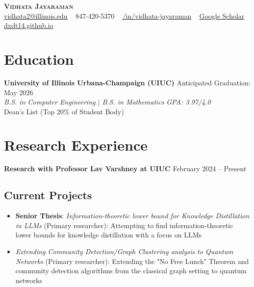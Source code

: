 \documentclass[letterpaper,10pt]{article}
\begin{document}
\begin{center}
    {\Huge \textbf{\scshape\textcolor{maincolor}{Vidhata Jayaraman}}}\\[5pt]
    \small
    {\color{maincolor}} \href{mailto:vidhata2@illinois.edu}{vidhata2@illinois.edu} {\raisebox{1.5pt}{\tiny\textbullet}}\ 
    {\color{maincolor}} 847-420-5370 {\raisebox{1.5pt}{\tiny\textbullet}}\ 
    {\color{maincolor}} \href{https://www.linkedin.com/in/vidhata-jayaraman/}{/in/vidhata-jayaraman} {\raisebox{1.5pt}{\tiny\textbullet}}\ 
    {\color{maincolor}\faGraduationCap} \href{https://scholar.google.com/citations?user=f16twSMAAAAJ&hl=en}{Google Scholar} {\raisebox{1.5pt}{\tiny\textbullet}}\ 
    {\color{maincolor}} \href{https://dxdt14.github.io/}{dxdt14.github.io}
\end{center}

\vspace{-3pt}


\section{Education}
\textbf{University of Illinois Urbana-Champaign (UIUC)} \hfill Anticipated Graduation: May 2026\\
\textit{B.S. in Computer Engineering $|$ B.S. in Mathematics} \hfill \textit{GPA: 3.97/4.0} \\
\small Dean's List (Top 20\% of Student Body)

\section{Research Experience}

\textbf{Research with Professor Lav Varshney at UIUC} \hfill February 2024 -- Present\vspace{-8pt}
\subsection{Current Projects}
\begin{itemize}[itemsep=-5pt, parsep=5pt, leftmargin=0.25in]
    \item \textbf{Senior Thesis}: \textit{Information-theoretic lower bound for Knowledge Distillation in LLMs} (Primary researcher): Attempting to find information-theoretic lower bounds for knowledge distillation with a focus on LLMs
    \item \textit{Extending Community Detection/Graph Clustering analysis to Quantum Networks} (Primary researcher): Extending the "No Free Lunch" Theorem and community detection algorithms from the classical graph setting to quantum networks
\end{itemize}\vspace{-10pt}
\end{document}
